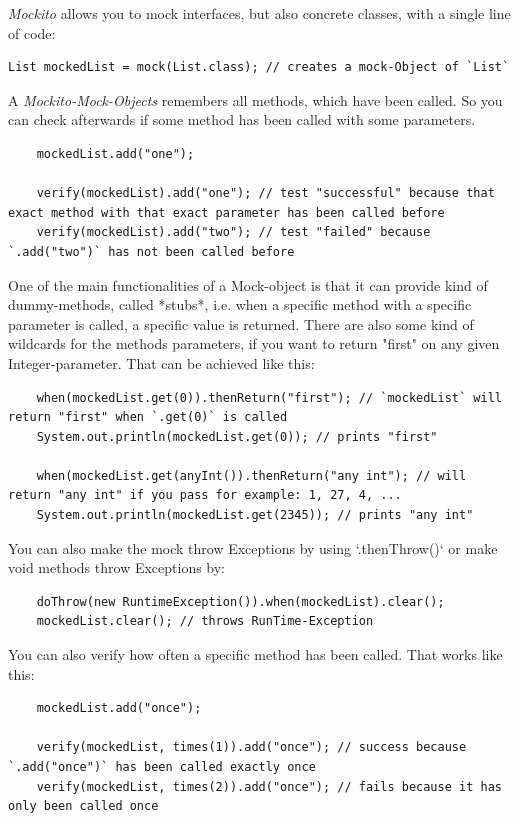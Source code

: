 \documentclass[11pt, a4paper]{article}
\begin{document}
\textit{Mockito} allows you to mock interfaces, but also concrete classes, with a single line of code:
	
\begin{lstlisting} 
List mockedList = mock(List.class); // creates a mock-Object of `List` 
\end{lstlisting}
	
A \textit{Mockito-Mock-Objects} remembers all methods, which have been called. So you can check afterwards if some method has been called with some parameters.
	
\begin{lstlisting}
	mockedList.add("one");
	    
	verify(mockedList).add("one"); // test "successful" because that exact method with that exact parameter has been called before
	verify(mockedList).add("two"); // test "failed" because `.add("two")` has not been called before
\end{lstlisting}

One of the main functionalities of a Mock-object is that it can provide kind of dummy-methods, called *stubs*, i.e. when a specific method with a specific parameter is called, a specific
value is returned. There are also some kind of wildcards for the methods parameters, if you want to return "first" on any given Integer-parameter. That can be achieved like this:

\begin{lstlisting}
    when(mockedList.get(0)).thenReturn("first"); // `mockedList` will return "first" when `.get(0)` is called
    System.out.println(mockedList.get(0)); // prints "first"
    
    when(mockedList.get(anyInt()).thenReturn("any int"); // will return "any int" if you pass for example: 1, 27, 4, ...
    System.out.println(mockedList.get(2345)); // prints "any int"
\end{lstlisting}

You can also make the mock throw Exceptions by using `.thenThrow()` or make void methods throw Exceptions by:

\begin{lstlisting}
    doThrow(new RuntimeException()).when(mockedList).clear();
    mockedList.clear(); // throws RunTime-Exception
\end{lstlisting}

You can also verify how often a specific method has been called. That works like this:

\begin{lstlisting}
    mockedList.add("once");
    
    verify(mockedList, times(1)).add("once"); // success because `.add("once")` has been called exactly once
    verify(mockedList, times(2)).add("once"); // fails because it has only been called once
\end{lstlisting}
\end{document}

